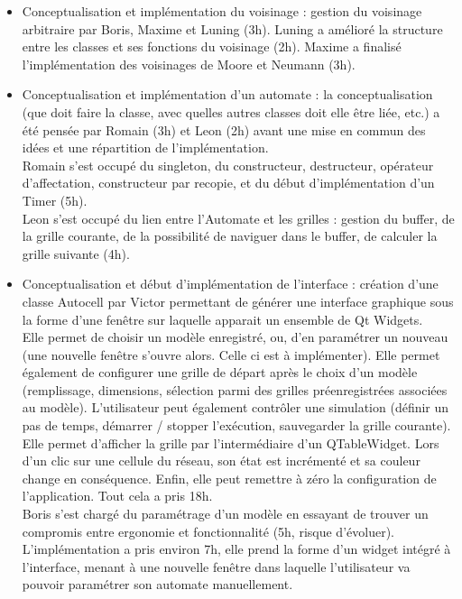 \documentclass[11pt]{article}
\begin{document}
\begin{itemize}
    \item Conceptualisation et implémentation du voisinage : gestion du voisinage arbitraire par Boris, Maxime et Luning (3h). Luning a amélioré la structure entre les classes et ses fonctions du voisinage (2h). Maxime a finalisé l’implémentation des voisinages de Moore et Neumann (3h).
    \bigskip
    \item Conceptualisation et implémentation d'un automate : la conceptualisation (que doit faire la classe, avec quelles autres classes doit elle être liée, etc.) a été pensée par Romain (3h) et Leon (2h) avant une mise en commun des idées et une répartition de l'implémentation. \\
    Romain s'est occupé du singleton, du constructeur, destructeur, opérateur d'affectation, constructeur par recopie, et du début d'implémentation d'un Timer (5h).\\
    Leon s'est occupé du lien entre l'Automate et les grilles : gestion du buffer, de la grille courante, de la possibilité de naviguer dans le buffer, de calculer la grille suivante (4h).
    \bigskip
    \item Conceptualisation et début d'implémentation de l'interface : création d'une classe Autocell par Victor permettant de générer une interface graphique sous la forme d’une fenêtre sur laquelle apparait un ensemble de Qt Widgets. \\
    Elle permet de choisir un modèle enregistré, ou, d’en paramétrer un nouveau (une nouvelle fenêtre s’ouvre alors. Celle ci est à implémenter). Elle permet également de configurer une grille de départ après le choix d’un modèle (remplissage, dimensions, sélection parmi des grilles préenregistrées associées au modèle). L'utilisateur peut également contrôler une simulation (définir un pas de temps, démarrer / stopper l’exécution, sauvegarder la grille courante). Elle permet d'afficher la grille par l’intermédiaire d’un QTableWidget. Lors d’un clic sur une cellule du réseau, son état est incrémenté et sa couleur change en conséquence. Enfin, elle peut remettre à zéro la configuration de l’application. Tout cela a pris 18h. \\
    Boris s'est chargé du paramétrage d'un modèle en essayant de trouver un compromis entre ergonomie et fonctionnalité (5h, risque d'évoluer). L'implémentation a pris environ 7h, elle prend la forme d’un widget intégré à l’interface, menant à une nouvelle fenêtre dans laquelle l’utilisateur va pouvoir paramétrer son automate manuellement.

\end{itemize}
\end{document}
